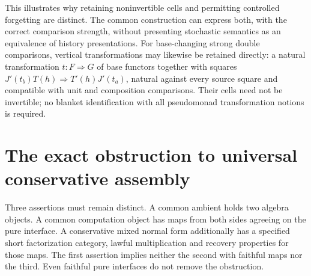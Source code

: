 \documentclass[11pt]{article}
\theoremstyle{definition}
\begin{document}
This illustrates why retaining noninvertible cells and permitting controlled
forgetting are distinct. The common construction can express both, with the
correct comparison strength, without presenting stochastic semantics as
an equivalence of history presentations. For base-changing strong double
comparisons, vertical transformations may likewise be retained directly:
a natural transformation $t:F\Rightarrow G$ of base functors together with
squares $J'(t_b)T(h)\Rightarrow T'(h)J'(t_a)$, natural against every source
square and compatible with unit and composition comparisons. Their cells
need not be invertible; no blanket identification with all pseudomonad
transformation notions is required.

\section{The exact obstruction to universal conservative assembly}\label{sec:obstruction}

Three assertions must remain distinct. A common ambient holds two algebra
objects. A common computation object has maps from both sides agreeing on
the pure interface. A conservative mixed normal form additionally has a
specified short factorization category, lawful multiplication and recovery
properties for those maps. The first assertion implies neither the second
with faithful maps nor the third. Even faithful pure interfaces do not
remove the obstruction.
\end{document}
